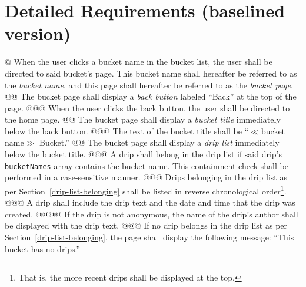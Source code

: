 \documentclass{article}
\begin{document}
\section*{Detailed Requirements (baselined version)}

\begin{easylist}[articletoc]
@ When the user clicks a bucket name in the bucket list, the user shall be directed to said bucket's page. This bucket name shall hereafter be referred to as the \textit{bucket name}, and this page shall hereafter be referred to as the \textit{bucket page}.
@@ The bucket page shall display a \textit{back button} labeled ``Back'' at the top of the page.
@@@ When the user clicks the back button, the user shall be directed to the home page.
@@ The bucket page shall display a \textit{bucket title} immediately below the back button.
@@@ The text of the bucket title shall be ``$\ll$bucket name$\gg$ Bucket.''
@@ The bucket page shall display a \textit{drip list} immediately below the bucket title.
@@@ \label{drip-list-belonging}A drip shall belong in the drip list if said drip's \texttt{bucketNames} array contains the bucket name. This containment check shall be performed in a case-sensitive manner.
@@@ Drips belonging in the drip list as per Section~\ref{drip-list-belonging} shall be listed in reverse chronological order\footnote{That is, the more recent drips shall be displayed at the top.}.
@@@ A drip shall include the drip text and the date and time that the drip was created.
@@@@ If the drip is not anonymous, the name of the drip's author shall be displayed with the drip text.
@@@ If no drip belongs in the drip list as per Section~\ref{drip-list-belonging}, the page shall display the following message: ``This bucket has no drips.''

\end{easylist}
\end{document}
